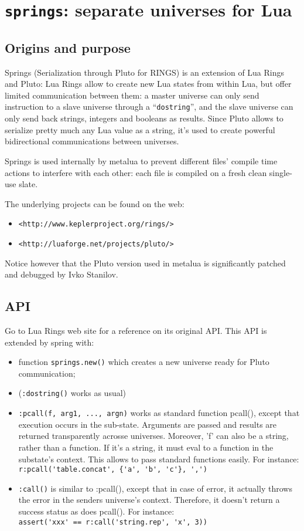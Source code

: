 \section{{\tt springs}: separate universes for Lua} 

\subsection{Origins and purpose}
Springs (Serialization through Pluto for RINGS) is an extension of Lua Rings and
Pluto: Lua Rings allow to create new Lua states from within Lua, but offer
limited communication between them: a master universe can only send instruction
to a slave universe through a ``{\tt dostring}'', and the slave universe can
only send back strings, integers and booleans as results. Since Pluto allows to
serialize pretty much any Lua value as a string, it's used to create powerful
bidirectional communications between universes.

Springs is used internally by metalua to prevent different files' compile time
actions to interfere with each other: each file is compiled on a fresh clean
single-use slate.

The underlying projects can be found on the web:
\begin{itemize}
\item \verb|<http://www.keplerproject.org/rings/>|
\item \verb|<http://luaforge.net/projects/pluto/>|
\end{itemize}
Notice however that the Pluto version used in metalua is significantly patched
and debugged by Ivko Stanilov.

\subsection{API}
Go to Lua Rings web site for a reference on its original API. This API is
extended by spring with:
\begin{itemize}
\item function {\tt springs.new()} which creates a new universe ready for Pluto
  communication;
\item ({\tt:dostring()} works as usual)
\item {\tt :pcall(f, arg1, ..., argn)} works as standard function pcall(),
  except that execution occurs in the sub-state. Arguments are passed and
  results are returned transparently acrosse universes. Moreover, 'f' can also
  be a string, rather than a function. If it's a string, it must eval to a
  function in the substate's context. This allows to pass standard functions
  easily. For instance:\\
  \verb|r:pcall('table.concat', {'a', 'b', 'c'}, ',')|
\item {\tt :call()} is similar to :pcall(), except that in case of error, it
  actually throws the error in the senders universe's context. Therefore, it
  doesn't return a success status as does pcall(). For instance: \\
  \verb|assert('xxx' == r:call('string.rep', 'x', 3))|
\end{itemize}
